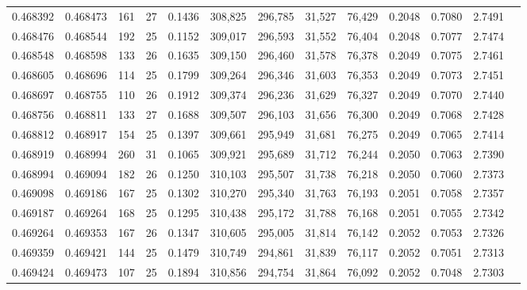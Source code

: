 \begin{tabular}{rrrrrrrrrrrrr}
0.468392 & 0.468473 & 161 &  27 &                                     0.1436 & 308,825 & 296,785 &  31,527 &  76,429 & 0.2048 & 0.7080 & 2.7491 \\
0.468476 & 0.468544 & 192 &  25 &                                     0.1152 & 309,017 & 296,593 &  31,552 &  76,404 & 0.2048 & 0.7077 & 2.7474 \\
0.468548 & 0.468598 & 133 &  26 &                                     0.1635 & 309,150 & 296,460 &  31,578 &  76,378 & 0.2049 & 0.7075 & 2.7461 \\
0.468605 & 0.468696 & 114 &  25 &                                     0.1799 & 309,264 & 296,346 &  31,603 &  76,353 & 0.2049 & 0.7073 & 2.7451 \\
0.468697 & 0.468755 & 110 &  26 &                                     0.1912 & 309,374 & 296,236 &  31,629 &  76,327 & 0.2049 & 0.7070 & 2.7440 \\
0.468756 & 0.468811 & 133 &  27 &                                     0.1688 & 309,507 & 296,103 &  31,656 &  76,300 & 0.2049 & 0.7068 & 2.7428 \\
0.468812 & 0.468917 & 154 &  25 &                                     0.1397 & 309,661 & 295,949 &  31,681 &  76,275 & 0.2049 & 0.7065 & 2.7414 \\
0.468919 & 0.468994 & 260 &  31 &                                     0.1065 & 309,921 & 295,689 &  31,712 &  76,244 & 0.2050 & 0.7063 & 2.7390 \\
0.468994 & 0.469094 & 182 &  26 &                                     0.1250 & 310,103 & 295,507 &  31,738 &  76,218 & 0.2050 & 0.7060 & 2.7373 \\
0.469098 & 0.469186 & 167 &  25 &                                     0.1302 & 310,270 & 295,340 &  31,763 &  76,193 & 0.2051 & 0.7058 & 2.7357 \\
0.469187 & 0.469264 & 168 &  25 &                                     0.1295 & 310,438 & 295,172 &  31,788 &  76,168 & 0.2051 & 0.7055 & 2.7342 \\
0.469264 & 0.469353 & 167 &  26 &                                     0.1347 & 310,605 & 295,005 &  31,814 &  76,142 & 0.2052 & 0.7053 & 2.7326 \\
0.469359 & 0.469421 & 144 &  25 &                                     0.1479 & 310,749 & 294,861 &  31,839 &  76,117 & 0.2052 & 0.7051 & 2.7313 \\
0.469424 & 0.469473 & 107 &  25 &                                     0.1894 & 310,856 & 294,754 &  31,864 &  76,092 & 0.2052 & 0.7048 & 2.7303 \\

\end{tabular}
